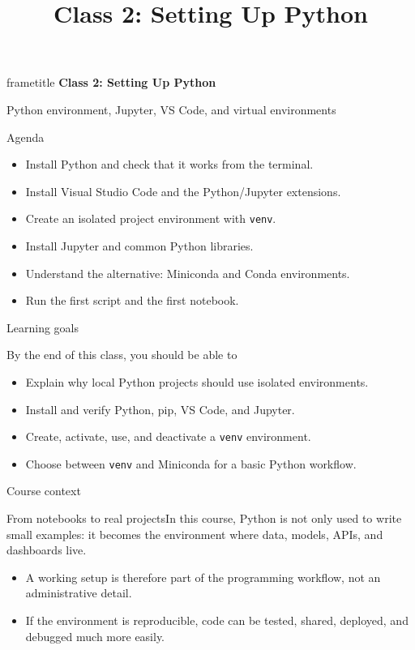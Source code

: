 \documentclass[aspectratio=169]{beamer}
\title{Class 2: Setting Up Python}
\author{}
\date{}
\newcommand{\coursefooter}{}
\newcommand{\learninggoals}[1]{\begin{block}{By the end of this class, you should be able to}#1\end{block}}
\newcommand{\coursecontextframe}[4]{
\begin{frame}{Course context}
\begin{block}{#1}#2\end{block}
\begin{itemize}
\item #3
\item #4
\end{itemize}
\coursefooter
\end{frame}}
\begin{document}
\begin{frame}[plain]
\vspace{1.2cm}
\begin{center}
\begin{beamercolorbox}[wd=0.92\paperwidth,ht=0.9cm,dp=0.25cm,center,rounded=true]{frametitle}
{\Large\bfseries Class 2: Setting Up Python}
\end{beamercolorbox}
\vspace{1.1cm}
{\large Python environment, Jupyter, VS Code, and virtual environments}
\end{center}
\end{frame}

\begin{frame}{Agenda}
\begin{itemize}
\item Install Python and check that it works from the terminal.
\item Install Visual Studio Code and the Python/Jupyter extensions.
\item Create an isolated project environment with \texttt{venv}.
\item Install Jupyter and common Python libraries.
\item Understand the alternative: Miniconda and Conda environments.
\item Run the first script and the first notebook.
\end{itemize}
\coursefooter
\end{frame}

\begin{frame}{Learning goals}
\learninggoals{
\begin{itemize}
\item Explain why local Python projects should use isolated environments.
\item Install and verify Python, pip, VS Code, and Jupyter.
\item Create, activate, use, and deactivate a \texttt{venv} environment.
\item Choose between \texttt{venv} and Miniconda for a basic Python workflow.
\end{itemize}}
\coursefooter
\end{frame}

\coursecontextframe
{From notebooks to real projects}
{In this course, Python is not only used to write small examples: it becomes the environment where data, models, APIs, and dashboards live.}
{A working setup is therefore part of the programming workflow, not an administrative detail.}
{If the environment is reproducible, code can be tested, shared, deployed, and debugged much more easily.}
\end{document}
